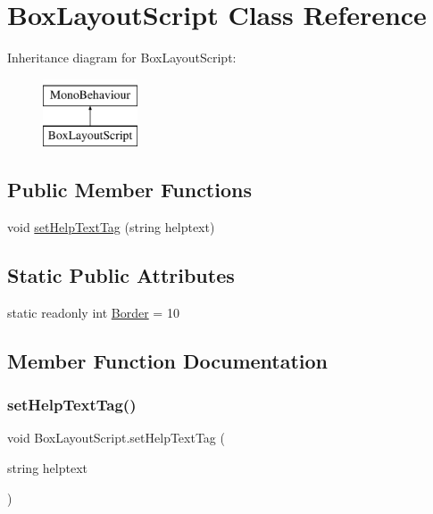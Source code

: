 \hypertarget{classBoxLayoutScript}{}\section{Box\+Layout\+Script Class Reference}
\label{classBoxLayoutScript}
Inheritance diagram for Box\+Layout\+Script\+:\begin{figure}[H]
\begin{center}
\leavevmode
\includegraphics[height=2.000000cm]{classBoxLayoutScript}
\end{center}
\end{figure}
\subsection*{Public Member Functions}
\begin{DoxyCompactItemize}
\item 
void \hyperlink{classBoxLayoutScript_a916a7f649c9349cbd0e8e901beec1750}{set\+Help\+Text\+Tag} (string helptext)
\end{DoxyCompactItemize}
\subsection*{Static Public Attributes}
\begin{DoxyCompactItemize}
\item 
static readonly int \hyperlink{classBoxLayoutScript_a1d68769db2eb86997d9c7cc937ab92ff}{Border} = 10
\end{DoxyCompactItemize}


\subsection{Member Function Documentation}
\mbox{\label{classBoxLayoutScript_a916a7f649c9349cbd0e8e901beec1750}} 
\subsubsection{\texorpdfstring{set\+Help\+Text\+Tag()}{setHelpTextTag()}}
{\footnotesize\ttfamily void Box\+Layout\+Script.\+set\+Help\+Text\+Tag (\begin{DoxyParamCaption}\item[{string}]{helptext }\end{DoxyParamCaption})\hspace{0.3cm}{\ttfamily [inline]}}



